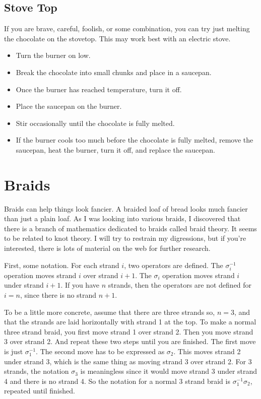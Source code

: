 \documentclass[10pt, openany]{book}
\begin{document}
\subsection{Stove Top}
If you are brave, careful, foolish, or some combination, you can try just melting the chocolate on the stovetop.  This may work best with an electric stove.
\begin{itemize}
  \item Turn the burner on low.
  \item Break the chocolate into small chunks and place in a saucepan.
  \item Once the burner has reached temperature, turn it off.
  \item Place the saucepan on the burner.
  \item Stir occasionally until the chocolate is fully melted.
  \item If the burner cools too much before the chocolate is fully melted, remove the saucepan, heat the burner, turn it off, and replace the saucepan.
\end{itemize}

\section{Braids}
\label{tip:Braid}
Braids can help things look fancier.  A braided loaf of bread looks much fancier than just a plain loaf.  As I was looking into various braids, I discovered that there is a branch of mathematics dedicated to braids called braid theory.  It seems to be related to knot theory.  I will try to restrain my digressions, but if you're interested, there is lots of material on the web for further research.

First, some notation.  For each strand $i$, two operators are defined.  The $\sigma^{-1}_i$ operation moves strand $i$ over strand $i+1$.  The $\sigma_i$ operation moves strand $i$ under strand $i+1$.  If you have $n$ strands, then the operators are not defined for $i=n$, since there is no strand $n+1$.

To be a little more concrete, assume that there are three strands so, $n=3$, and that the strands are laid horizontally with strand 1 at the top.  To make a normal three strand braid, you first move strand 1 over strand 2.  Then you move strand 3 over strand 2.  And repeat these two steps until you are finished.  The first move is just $\sigma^{-1}_1$.  The second move has to be expressed as $\sigma_2$.  This moves strand 2 under strand 3, which is the same thing as moving strand 3 over strand 2.  For 3 strands, the notation $\sigma_3$ is meaningless since it would move strand 3 under strand 4 and there is no strand 4.  So the notation for a normal 3 strand braid is $\sigma^{-1}_1\sigma_2$, repeated until finished.
\end{document}
